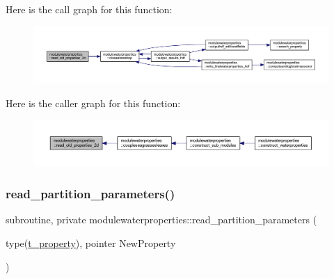 Here is the call graph for this function\+:\nopagebreak
\begin{figure}[H]
\begin{center}
\leavevmode
\includegraphics[width=350pt]{namespacemodulewaterproperties_a5a69094fb0cfdb28de4d2307ceeb3f84_cgraph}
\end{center}
\end{figure}
Here is the caller graph for this function\+:\nopagebreak
\begin{figure}[H]
\begin{center}
\leavevmode
\includegraphics[width=350pt]{namespacemodulewaterproperties_a5a69094fb0cfdb28de4d2307ceeb3f84_icgraph}
\end{center}
\end{figure}
\mbox{\label{namespacemodulewaterproperties_ac511e23eb2975f0a46fef2973712f060}} 
\subsubsection{\texorpdfstring{read\+\_\+partition\+\_\+parameters()}{read\_partition\_parameters()}}
{\footnotesize\ttfamily subroutine, private modulewaterproperties\+::read\+\_\+partition\+\_\+parameters (\begin{DoxyParamCaption}\item[{type(\mbox{\hyperlink{structmodulewaterproperties_1_1t__property}{t\+\_\+property}}), pointer}]{New\+Property }\end{DoxyParamCaption})\hspace{0.3cm}{\ttfamily [private]}}

